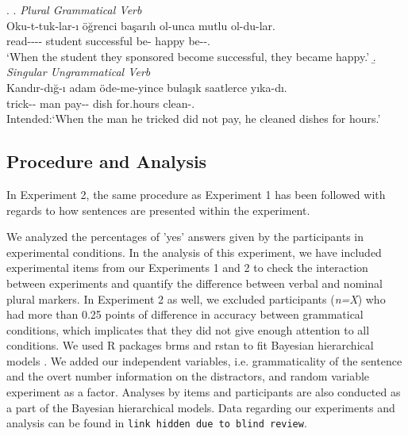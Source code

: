 \documentclass[a4paper,man,natbib]{apa6}\usepackage[]{graphicx}\usepackage[]{color}
\begin{document}
\ex. \label{item:exp2FillerItems}
\a. \textit{Plural Grammatical Verb}\\ 
\gll Oku-t-tuk-lar-ı öğrenci başarılı ol-unca mutlu ol-du-lar.\\ 
read-\Caus{}-\Nmlz{}-\Pl{}-\Poss{}  student successful be-\Nmlz{} happy be-\Pst{}-\Pl{}.\\
\glt `When the student they sponsored become successful, they became happy.' 
\b. \textit{Singular Ungrammatical Verb}\\ 
\gll *Kandır-dığ-ı adam öde-me-yince bulaşık saatlerce yıka-dı.\\ 
trick-\Nmlz{}-\Poss{}  man pay-\Neg{}-\Nmlz{} dish for.hours clean-\Pst{}.\\
\glt Intended:`When the man he tricked did not pay, he cleaned dishes for hours.'


\subsection{Procedure and Analysis} \label{sec:exp2:procedure_analysis}

In Experiment 2, the same procedure as Experiment 1 has been followed with regards to how sentences are presented within the experiment. 

We analyzed the percentages of 'yes' answers given by the participants in experimental conditions. In the analysis of this experiment, we have included experimental items from our Experiments 1 and 2 to check the interaction between experiments and quantify the difference between verbal and nominal plural markers. In Experiment 2 as well, we excluded participants (\textit{n=X}) who had more than 0.25 points of difference in accuracy between grammatical conditions, which implicates that they did not give enough attention to all conditions. We used R packages brms \citep{R-brms_b} and rstan \citep{R-stan} to fit Bayesian hierarchical models \citep{GelmanHill:2007}. We added our independent variables, i.e. grammaticality of the sentence and the overt number information on the distractors, and random variable experiment as a factor. Analyses by items and participants are also conducted as a 
part of the Bayesian hierarchical models. Data regarding our experiments and analysis can be found in \texttt{link hidden due to blind review}.
\end{document}
